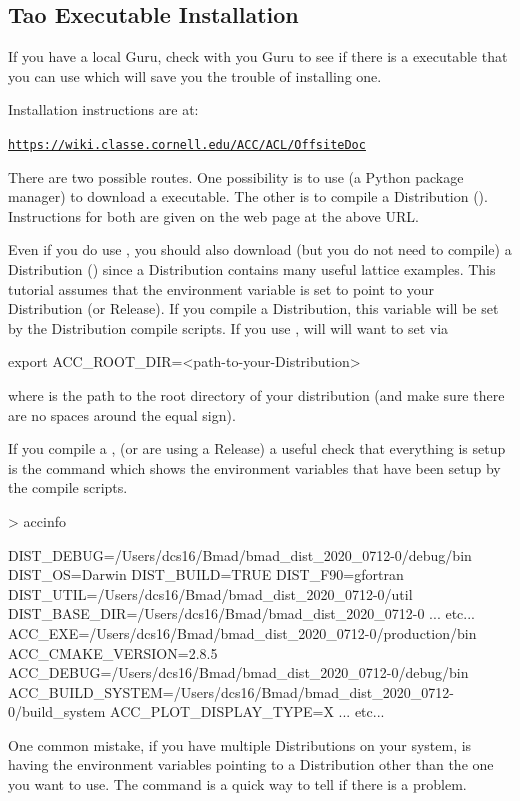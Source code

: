 \documentclass{hitec}     %
\newenvironment{display}
  {\vspace*{-1.5ex} \begin{alltt}}
  {\end{alltt} \vspace*{-1.0ex}}
\begin{document}
\subsection{Tao Executable Installation}
\label{s:install}

If you have a local \bmad Guru, check with you Guru to see if there is a \tao executable that you
can use which will save you the trouble of installing one.

Installation instructions are at:
\begin{display}
  \url{https://wiki.classe.cornell.edu/ACC/ACL/OffsiteDoc}
\end{display}
There are two possible routes. One possibility is to use  (a Python
package manager) to download a \tao executable. The other is to compile a \bmad Distribution
(). Instructions for both are given on the web page at the above URL.

Even if you do use , you should also download (but you do not need to compile) a
Distribution () since a Distribution contains many useful lattice examples.  This
tutorial assumes that the environment variable  is set to point to your Distribution
(or Release). If you compile a Distribution, this variable will be set by the Distribution compile
scripts. If you use , will will want to set  via
\begin{code}
export ACC_ROOT_DIR=<path-to-your-Distribution>
\end{code}
where  is the path to the root directory of your distribution (and
make sure there are no spaces around the equal sign).

If you compile a , (or are using a Release) a useful check that everything is setup
is the  command which shows the environment variables that have been setup by the
compile scripts.
\begin{code}
> accinfo

DIST_DEBUG=/Users/dcs16/Bmad/bmad_dist_2020_0712-0/debug/bin
DIST_OS=Darwin
DIST_BUILD=TRUE
DIST_F90=gfortran
DIST_UTIL=/Users/dcs16/Bmad/bmad_dist_2020_0712-0/util
DIST_BASE_DIR=/Users/dcs16/Bmad/bmad_dist_2020_0712-0
... etc...
ACC_EXE=/Users/dcs16/Bmad/bmad_dist_2020_0712-0/production/bin
ACC_CMAKE_VERSION=2.8.5
ACC_DEBUG=/Users/dcs16/Bmad/bmad_dist_2020_0712-0/debug/bin
ACC_BUILD_SYSTEM=/Users/dcs16/Bmad/bmad_dist_2020_0712-0/build_system
ACC_PLOT_DISPLAY_TYPE=X
... etc...
\end{code}
One common mistake, if you have multiple Distributions on your system, is having the environment
variables pointing to a Distribution other than the one you want to use. The  command
is a quick way to tell if there is a problem.
\end{document}
